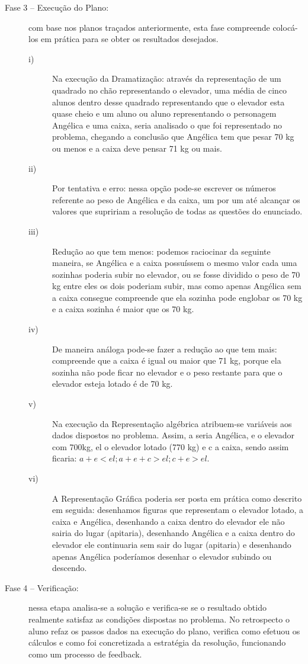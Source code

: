 \documentclass[a4paper, 12pt]{article}
\begin{document}
\begin{enumerate}
\begin{description}
  \item[Fase 3 – Execução do Plano:] com base nos planos traçados anteriormente, esta fase compreende colocá-los em prática para se obter os resultados desejados.
    \begin{description}
    \item[i)] Na execução da Dramatização: através da representação de um quadrado no chão representando o elevador, uma média de cinco alunos dentro desse quadrado representando que o elevador esta quase cheio e um aluno ou aluno representando o personagem Angélica e uma caixa, seria analisado o que foi representado no problema, chegando a conclusão que Angélica tem que pesar 70 kg ou menos e a caixa deve pensar 71 kg ou mais.
    \item[ii)] Por tentativa e erro: nessa opção pode-se escrever os números referente ao peso de Angélica e da caixa, um por um até alcançar os valores que supririam a resolução de todas as questões do enunciado.
    \item[iii)] Redução ao que tem menos: podemos raciocinar da seguinte maneira, se Angélica e a caixa possuíssem o mesmo valor cada uma sozinhas poderia subir no elevador, ou se fosse dividido o peso de 70 kg entre eles os dois poderiam subir, mas como apenas Angélica sem a caixa consegue compreende que ela sozinha pode englobar os 70 kg e a caixa sozinha é maior que os 70 kg.
    \item[iv)] De maneira análoga pode-se fazer a redução ao que tem mais: compreende que a caixa é igual ou maior que 71 kg, porque ela sozinha não pode ficar no elevador e o peso restante para que o elevador esteja lotado é de 70 kg.
    \item[v)] Na execução da Representação algébrica atribuem-se variáveis aos dados dispostos no problema. Assim, a seria Angélica, e o elevador com 700kg, el o elevador lotado (770 kg) e c a caixa, sendo assim ficaria: $ a+e < el; a+e+c > el; c+e > el $.
    \item[vi)] A Representação Gráfica poderia ser posta em prática como descrito em seguida: desenhamos figuras que representam o elevador lotado, a caixa e Angélica, desenhando a caixa dentro do elevador ele não sairia do lugar (apitaria), desenhando Angélica e a caixa dentro do elevador ele continuaria sem sair do lugar (apitaria) e desenhando apenas Angélica poderíamos desenhar o elevador subindo ou descendo.
    \end{description}
\item[Fase 4 – Verificação:] nessa etapa analisa-se a solução e verifica-se se o resultado obtido realmente satisfaz as condições dispostas no problema. No retrospecto o aluno refaz os passos dados na execução do plano, verifica como efetuou os cálculos e como foi concretizada a estratégia da resolução, funcionando como um processo de feedback.

  \end{description}
 
\end{enumerate}
\end{document}
